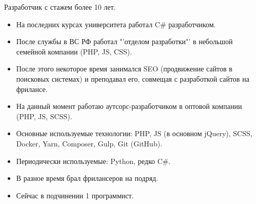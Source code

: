 \documentclass[10pt]{tpl/developercv} %
\begin{document}
\vspace{0.5cm}



\begin{minipage}[t]{0.55\textwidth} %
	\vspace{-\baselineskip} %


	Разработчик с стажем более 10 лет.
  \bigskip
  \small{
    \begin{itemize}[leftmargin=1pt]
      \item На последних курсах университета работал C\# разработчиком.
      \item После службы в ВС РФ работал "'отделом разработки"' в небольшой семейной компании (PHP, JS, CSS).
      \item После этого некоторое время занимался SEO (продвижение сайтов в поисковых системах) и преподавал его, совмещая с разработкой сайтов на фрилансе.
      \item На данный момент работаю аутсорс-разработчиком в оптовой компании (PHP, JS, SCSS).
      \item Основные используемые технологии: PHP, JS (в основном jQuery), SCSS, Docker, Yarn, Composer, Gulp, {Git (GitHub)}.
      \item Периодически используемые: Python, редко C\#.
      \item В разное время брал фрилансеров на подряд.
      \item Сейчас в подчинении 1 программист.
    \end{itemize}
  }
\end{minipage}
\hfill %
\begin{minipage}[t]{0.35\textwidth} %
	 \vspace{-\baselineskip} %


\end{minipage}
\end{document}
